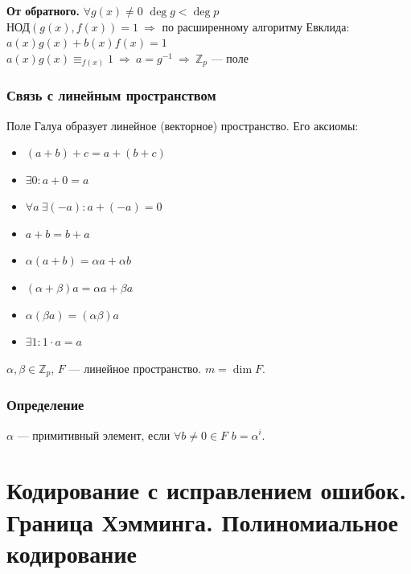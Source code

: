 \documentclass[12pt]{article}
\renewcommand{\gcd}{\text{НОД}}
\begin{document}
\textbf{От обратного.} $\forall g(x) \neq 0$ $\deg g < \deg p$ \\
$\gcd(g(x), f(x)) = 1\ \Rightarrow$ по расширенному алгоритму Евклида:\\
$a(x)g(x) + b(x)f(x) = 1$ \\
$a(x)g(x) \equiv_{f(x)} 1\ \Rightarrow\ a = g^{-1} \ \Rightarrow\ \mathbb{Z}_p$ — поле

\subsubsection{Связь с линейным пространством}
Поле Галуа образует линейное (векторное) пространство. Его аксиомы:
\begin{itemize}
    \item $(a + b) + c = a + (b + c)$
    \item $\exists 0 : a + 0 = a$
    \item $\forall a \  \exists(-a) : a + (-a) = 0$
    \item $a + b = b + a$
    \item $\alpha(a + b) = \alpha a + \alpha b$
    \item $(\alpha + \beta)a = \alpha a + \beta a$
    \item $\alpha(\beta a) = (\alpha \beta) a$
    \item $\exists 1 : 1 \cdot a = a$
\end{itemize}

$\alpha, \beta \in \mathbb{Z}_p$, $F$ — линейное пространство. $m = \dim F$.

\subsubsection{Определение}
$\alpha$ — примитивный элемент, если $\forall b \neq 0 \in F$ \qquad $b = \alpha^i$.

\section{Кодирование с исправлением ошибок. Граница Хэмминга. Полиномиальное кодирование}
\end{document}
